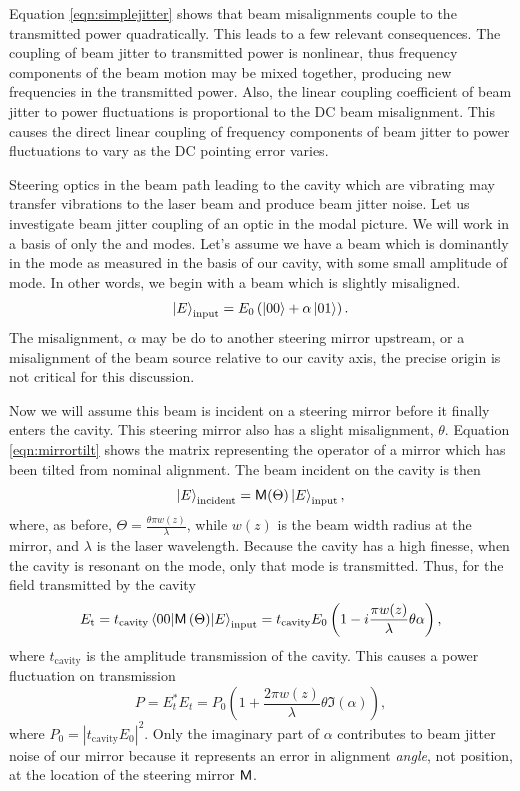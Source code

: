 Equation \ref{eqn:simplejitter} shows that beam misalignments couple to the transmitted power quadratically. %
This leads to a few relevant consequences. %
The coupling of beam jitter to transmitted power is nonlinear, thus frequency components of the beam motion may be mixed together, producing new frequencies in the transmitted power. %
Also, the linear coupling coefficient of beam jitter to power fluctuations is proportional to the DC beam misalignment. %
This causes the direct linear coupling of frequency components of beam jitter to power fluctuations to vary as the DC pointing error varies.

Steering optics in the beam path leading to the cavity which are vibrating may transfer vibrations to the laser beam and produce beam jitter noise. %
Let us investigate beam jitter coupling of an optic in the modal picture. %
 We will work in a basis of only the  and  modes. %
Let's assume we have a beam which is dominantly in the  mode as measured in the basis of our cavity, with some small amplitude of  mode. %
In other words, we begin with a beam which is slightly misaligned.
\begin{equation}
\left| E \right>_{\text{input}}=E_0\left(\left| 00 \right>+\alpha\left| 01 \right>\right).
\end{equation}
The misalignment, $\alpha$ may be do to another steering mirror upstream, or a misalignment of the beam source relative to our cavity axis, the precise origin is not critical for this discussion.

Now we will assume this beam is incident on a steering mirror before it finally enters the cavity. %
This steering mirror also has a slight misalignment, $\theta$. %
Equation \ref{eqn:mirrortilt} shows the matrix representing the operator of a mirror which has been tilted from nominal alignment. %
The beam incident on the cavity is then
\begin{equation}
\left| E \right>_{\text{incident}}=\mathsf{M}(\Theta)\left| E \right>_{\text{input}},
\end{equation}
where, as before, $\Theta=\frac{\theta \pi w(z)}{\lambda}$, while $w(z)$ is the beam width radius at the mirror, and $\lambda$ is the laser wavelength. %
Because the cavity has a high finesse, when the cavity is resonant on the  mode, only that mode is transmitted. %
Thus, for the field transmitted by the cavity
\begin{equation}
E_{\text{t}}=t_{\text{cavity}}\matrixel{00}{\oper{M}\left(\Theta\right)}{E}_{\text{input}}=t_{\text{cavity}}E_0\left(1-i\frac{ \pi w(z)}{\lambda}\theta\alpha\right),
\end{equation}
where $t_{\text{cavity}}$ is the amplitude transmission of the cavity. %
This causes a power fluctuation on transmission
\begin{equation}
\label{eqn:mirrorjitter}
P=E_t^*E_t=P_0\left(1+\frac{2\pi w(z)}{\lambda}\theta\Im(\alpha)\right),
\end{equation}
where $P_0=|t_{\text{cavity}}E_0|^2$. %
Only the imaginary part of $\alpha$ contributes to beam jitter noise of our mirror because it represents an error in alignment \emph{angle}, not position, at the location of the steering mirror $\mathsf{M}$.

